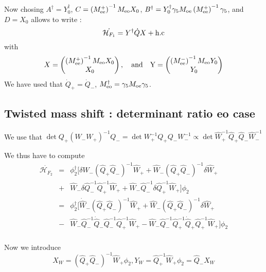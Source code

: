 \documentclass{article}[12pt]
\begin{document}
Now chosing $A^\dagger= Y^\dagger_0 $,
$C=\left(M^{+}_{\rm{ee}}\right)^{-1} M_{\rm{eo}} X_0 $, $B^\dagger=
 Y_0^\dagger \gamma_5 M_{\rm{oe}}
     \left(M^{+}_{\rm{ee}}\right)^{-1} \gamma_5$, and $D= X_0$ allows to write :
\begin{equation}
\dot{\mathcal{H}_{F_1}} =   Y^\dagger \dot{Q} X
  + \rm{h.c}
\end{equation}
with
\begin{equation}
X=\begin{pmatrix}\left(M^{+}_{\rm{ee}}\right)^{-1} M_{\rm{eo}} X_0
  \\ X_0 \end{pmatrix},\quad \rm{and} \quad Y=\begin{pmatrix}
   \left(M^{-}_{\rm{ee}}\right)^{-1} M_{\rm{eo}} Y_0
  \\ Y_0 \end{pmatrix}
\end{equation}
We have used that   $\dot{Q}_+= \dot{Q}_-$, $M_{\rm{eo}}^{\dagger}=
\gamma_5 M_{\rm{oe}} \gamma_5$.

\subsection{Twisted mass shift : determinant ratio  eo case}

We use that $\det{ Q_+ (W_-
 W_+)^{-1} Q_-} = \det{W_+^{-1} Q_+ Q_- W_-^{-1}} \propto\det{\hat{W}_+^{-1} \hat{Q}_+ \hat{Q}_- \hat{W}_-^{-1}}  $

We thus have to compute
\begin{eqnarray}
\dot{\mathcal{H}_{F_2}}  &=& \phi_2^\dagger\big[ \delta \hat{W}_-
(\hat{Q}_+ \hat{Q}_-)^{-1} \hat{W}_+  +  \hat{W}_-
(\hat{Q}_+ \hat{Q}_-)^{-1} \delta \hat{W}_+ \\
&+&  \hat{W}_- \delta \hat{Q}_-^{-1} \hat{Q}_+^{-1} \hat{W}_+ +
\hat{W}_- \hat{Q}_-^{-1} \delta \hat{Q}_+^{-1} \hat{W}_+   \big] \phi_2 \\
&=& \phi_2^\dagger\big[ \dot{\hat{W}}_-
(\hat{Q}_+ \hat{Q}_-)^{-1} \hat{W}_+  +  \hat{W}_-
(\hat{Q}_+ \hat{Q}_-)^{-1} \delta \hat{W}_+ \\
&-&  \hat{W}_- \hat{Q}_-^{-1} \dot{\hat{Q}}_- \hat{Q}_-^{-1} \hat{Q}_+^{-1} \hat{W}_+ -
\hat{W}_- \hat{Q}_-^{-1} \hat{Q}_+^{-1} \dot{\hat{Q}}_+ \hat{Q}_+^{-1} \hat{W}_+   \big] \phi_2 \\
\end{eqnarray}

Now we introduce
\begin{equation}
X_W =  (\hat{Q}_+ \hat{Q}_-)^{-1} \hat{W}_+ \phi_2,  Y_W =
\hat{Q}_+^{-1} \hat{W}_+\phi_2 = \hat{Q}_- X_W
\end{equation}
\end{document}
